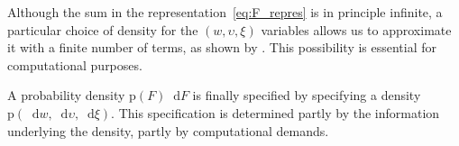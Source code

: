 \documentclass[a4paper,12pt,%
onecolumn,oneside,article,%
british%
]{memoir}
\makeatletter
\def\sum{\DOTSI\sumop\slimits@}
\def\prod{\DOTSI\prodop\slimits@}
\newcommand*{\di}{\mathop{}\!\mathrm{d}}%
\newcommand*{\defd}{\coloneqq}
\newcommand*{\p}{\mathrm{p}}%
\renewcommand*{\|}[1][]{\nonscript\:#1\vert\nonscript\:\mathopen{}}
\newcommand*{\eqn}{eq.}%
\makeatother
\begin{document}
Although the sum in the representation~\eqref{eq:F_repres} is in principle infinite, a particular choice of density for the $(w,\upsilon,\xi)$ variables allows us to approximate it with a finite number of terms, as shown by \cites{ishwaranetal2002b}. This possibility is essential for computational purposes.






A probability density $\p(F ) \di F$ is finally specified by specifying a density $\p(\di w, \di\upsilon, \di\xi)$. This specification is determined partly by the information underlying the density, partly by computational demands.
\end{document}
